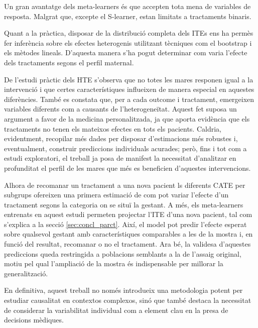 \documentclass[../main.tex]{subfiles}
\begin{document}
Un gran avantatge dels meta-learners és que accepten tota mena de variables de resposta. Malgrat que, excepte el S-learner, estan limitats a tractaments binaris.\par
Quant a la pràctica, disposar de la distribució completa dels ITEs ens ha permès fer inferència sobre els efectes heterogenis utilitzant tècniques com el bootstrap i els mètodes lineals. D’aquesta manera s’ha pogut determinar com varia l’efecte dels tractaments segons el perfil maternal.\par
De l’estudi pràctic dels HTE s’observa que no totes les mares responen igual a la intervenció i que certes característiques influeixen de manera especial en aquestes diferències. També es constata que, per a cada outcome i tractament, emergeixen variables diferents com a causants de l’heterogeneïtat. Aquest fet suposa un argument a favor de la medicina personalitzada, ja que aporta evidència que els tractaments no tenen els mateixos efectes en tots els pacients. Caldria, evidentment, recopilar més dades per disposar d’estimacions més robustes i, eventualment, construir prediccions individuals acurades; però, fins i tot com a estudi exploratori, el treball ja posa de manifest la necessitat d’analitzar en profunditat el perfil de les mares que més es beneficien d’aquestes intervencions.\par
Alhora de recomanar un tractament a una nova pacient ls diferents CATE per subgrups ofereixen una primera estimació de com pot variar l’efecte d’un tractament segons la categoria on se situï la gestant. A més, els meta‑learners entrenats en aquest estudi permeten projectar l'ITE d’una nova pacient, tal com s’explica a la secció \ref{sec:concl_parct}. Així, el model pot predir l’efecte esperat sobre qualsevol gestant amb característiques comparables a les de la mostra i, en funció del resultat, recomanar o no el tractament. Ara bé, la validesa d’aquestes prediccions queda restringida a poblacions semblants a la de l’assaig original, motiu pel qual l’ampliació de la mostra és indispensable per millorar la generalització.\par
En definitiva, aquest treball no només introdueix una metodologia potent per estudiar causalitat en contextos complexos, sinó que també destaca la necessitat de considerar la variabilitat individual com a element clau en la presa de decisions mèdiques.

    
\end{document}
